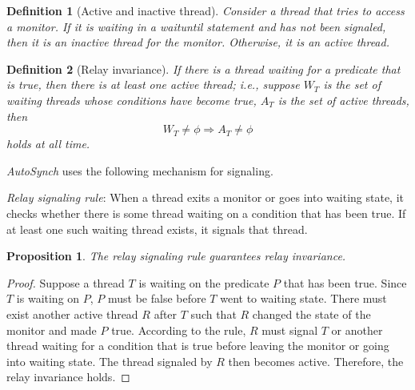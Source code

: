 \documentclass[preprint]{sigplanconf}
\newtheorem{definition}{Definition}
\newtheorem{proposition}{Proposition}
\begin{document}
\begin{definition}[Active and inactive thread] 
    Consider a thread that tries to access a monitor. If it is waiting in a
    {\em waituntil} statement and has not been signaled, then it is an {\em inactive} 
    thread for the monitor. Otherwise, it is an {\em active} thread. 
\end{definition}

\begin{definition}[Relay invariance]
    If there is a thread waiting for a predicate that is true, then there is at
    least one active thread; i.e., suppose $W_T$ is the set of waiting threads
    whose conditions have become true, $A_T$ is the set of active threads,
    then
    \[
        W_T \ne \phi \Rightarrow A_T \ne \phi 
    \]
    holds at all time. 
\end{definition}

{\em AutoSynch} uses the following mechanism for signaling.

{\em Relay signaling rule}: When a thread exits a monitor or goes into waiting 
    state, it checks whether there is some thread waiting on a condition that 
    has been true. If at least one such waiting thread exists, it signals that 
    thread.
    
\begin{proposition} \label{pro:relay_signal}
     The relay signaling rule guarantees relay invariance. 
\end{proposition}
\begin{proof}
    Suppose a thread $T$ is waiting on the predicate $P$ that has been true. Since 
    $T$ is waiting 
    on $P$, $P$ must be false before $T$ went to waiting state. There must 
    exist another active thread $R$ after $T$ such that $R$ changed the state 
    of the monitor and made  $P$ true. According to the rule, $R$ must signal
    $T$ or another thread waiting for a condition that is true before leaving the
    monitor or going into waiting state. The thread signaled by $R$ then
    becomes active. Therefore, the relay invariance holds. 
 
 \end{proof}
\end{document}
